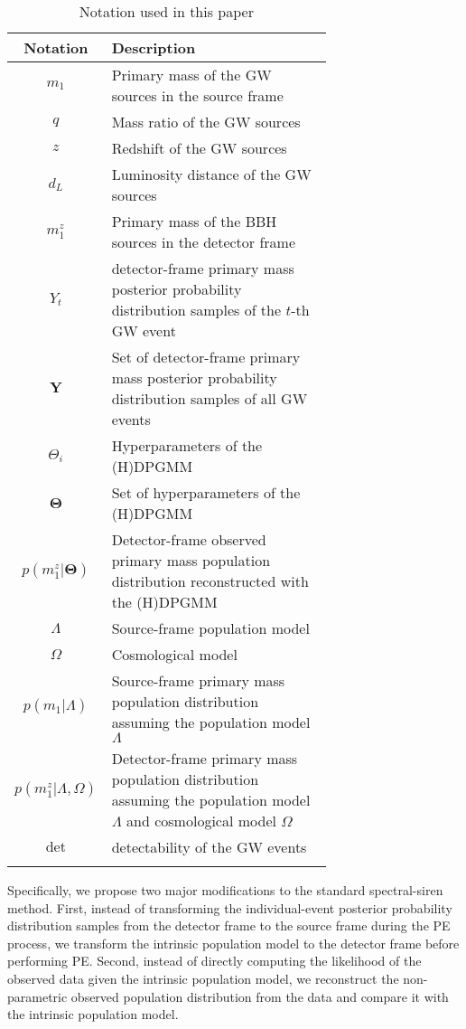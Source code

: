 \documentclass[sn-aps, pdflatex, iicol]{sn-jnl}
\begin{document}
\begin{table}
    \caption{Notation used in this paper}
    \begin{tabular}{cp{0.7\linewidth}}
        \toprule
        Notation & Description \\
        \midrule
        $m_1$ & Primary mass of the \ac{GW} sources in the source frame \\
        $q$ & Mass ratio of the \ac{GW} sources \\
        $z$ & Redshift of the \ac{GW} sources \\
        $d_L$ & Luminosity distance of the \ac{GW} sources \\
        $m^z_1$ & Primary mass of the \ac{BBH} sources in the detector frame \\
        $Y_t$ & detector-frame primary mass posterior probability distribution samples of the $t$-th \ac{GW} event \\
        $\mathbf{Y}$ & Set of detector-frame primary mass posterior probability distribution samples of all \ac{GW} events \\
        $\Theta_i$ & Hyperparameters of the \ac{(H)DPGMM} \\
        $\mathbf{\Theta}$ & Set of hyperparameters of the \ac{(H)DPGMM} \\
        $p(m^z_1|\mathbf{\Theta})$ & Detector-frame observed primary mass population distribution reconstructed with the \ac{(H)DPGMM} \\
        $\Lambda$ & Source-frame population model \\
        $\Omega$ & Cosmological model \\
        $p(m_1|\Lambda)$ & Source-frame primary mass population distribution assuming the population model $\Lambda$ \\
        $p(m^z_1|\Lambda, \Omega)$ & Detector-frame primary mass population distribution assuming the population model $\Lambda$ and cosmological model $\Omega$ \\
        $\mathrm{det}$ & detectability of the \ac{GW} events \\
        \botrule
    \end{tabular}
    \label{tab:notation}
\end{table}

Specifically, we propose two major modifications to the standard spectral-siren method.
First, instead of transforming the individual-event posterior probability distribution samples from the detector frame to the source frame during the \ac{PE} process, we transform the intrinsic population model to the detector frame before performing \ac{PE}.
Second, instead of directly computing the likelihood of the observed data given the intrinsic population model, we reconstruct the non-parametric observed population distribution from the data and compare it with the intrinsic population model.
\end{document}
